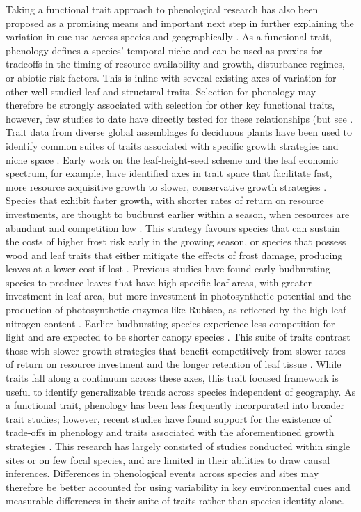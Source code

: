 \documentclass{article}\usepackage[]{graphicx}\usepackage[]{color}
\begin{document}
Taking a functional trait approach to phenological research has also been proposed as a promising means and important next step in further explaining the variation in cue use across species and geographically \citep{Flynn2018, Osada2018}. As a functional trait, phenology defines a species' temporal niche and can be used as proxies for tradeoffs in the timing of resource availability and growth, disturbance regimes, or abiotic risk factors. This is inline with several existing axes of variation for other well studied leaf and structural traits. Selection for phenology may therefore be strongly associated with selection for other key functional traits, however, few studies to date have directly tested for these relationships (but see \citep{Osada2018, Sun 2006, Lechowicz1984}. Trait data from diverse global assemblages fo deciduous plants have been used to identify common suites of traits associated with specific growth strategies and niche space \citep{Westoby1998, Wright2004, Chave2009}. Early work on the leaf-height-seed scheme and the leaf economic spectrum, for example, have identified axes in trait space that facilitate fast, more resource acquisitive growth to slower, conservative growth strategies \citep{Westoby1998, Wright2004, Diaz2016, Chave2009, Funk2016}. Species that exhibit faster growth, with shorter rates of return on resource investments, are thought to budburst earlier within a season, when resources are abundant and competition low \citep{citation}. This strategy favours species that can sustain the costs of higher frost risk early in the growing season, or species that possess wood and leaf traits that either mitigate the effects of frost damage, producing leaves at a lower cost if lost \citep{Lechowicz1984, Lenz2013}. Previous studies have found early budbursting species to produce leaves that have high specific leaf areas, with greater investment in leaf area, but more investment in photosynthetic potential and the production of photosynthetic enzymes like Rubisco, as reflected by the high leaf nitrogen content \citep{citation}. Earlier budbursting species experience less competition for light and are expected to be shorter canopy species \citep{citation}. This suite of traits contrast those with slower growth strategies that benefit competitively from slower rates of return on resource investment and the longer retention of leaf tissue \citep{citation}. While traits fall along a continuum across these axes, this trait focused framework is useful to identify generalizable trends across species independent of geography. As a functional trait, phenology has been less frequently incorporated into broader trait studies; however, recent studies have found support for the existence of trade-offs in phenology and traits associated with the aforementioned growth strategies \citep{citations from Kelly's review}. This research has largely consisted of studies conducted within single sites or on few focal species, and are limited in their abilities to draw causal inferences. Differences in phenological events across species and sites may therefore be better accounted for using variability in key environmental cues and measurable differences in their suite of traits rather than species identity alone. 
 
\end{document}
